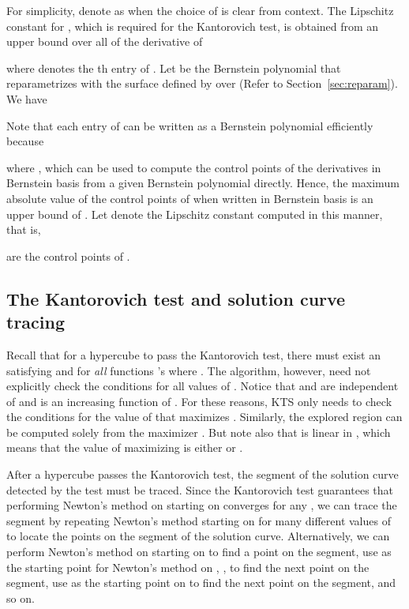 \documentclass{article}
\begin{document}
For simplicity, denote  as  when the choice of 
is clear from context.  The Lipschitz constant for , which is required for the Kantorovich test, is obtained
from an upper bound over all  of the derivative of 

where  denotes the th entry of
. Let  be
the Bernstein polynomial that reparametrizes with  the
surface defined by  over  (Refer to Section~\ref{sec:reparam}).
We have

Note that each entry of  can be written as a Bernstein
polynomial efficiently because

where , which can be used to compute
the control points of the derivatives in Bernstein basis from a
given Bernstein polynomial directly. Hence, the maximum absolute
value of the control points of  when written in
Bernstein basis is an upper bound of . Let  denote the Lipschitz
constant computed in this manner, that is,

 are the control points
of .


\subsection{The Kantorovich test and solution curve tracing}
\label{section_impkan}

Recall that for a hypercube  to pass the Kantorovich test,
there must exist an  satisfying  and  for
\emph{all} functions 's where . The algorithm, however, need not explicitly check the
conditions for all values of .  Notice that  and
 are independent of  and  is an increasing function
of .  For these reasons, KTS only needs to check the
conditions for the value of  that maximizes . Similarly,
the explored region  can be computed solely from the
maximizer .  But note also that  is linear in , which
means that the value of  maximizing  is either 
or .

After a hypercube passes the Kantorovich test, the segment of the
solution curve detected by the test must be traced.  Since
the Kantorovich test guarantees that performing Newton's
method on  starting on  converges for any , we can trace the segment by
repeating Newton's method starting on  for many different
values of  to locate the points on the segment of the
solution curve.  Alternatively, we can perform Newton's method on  starting on  to find a point  on the segment, use  as the starting point for Newton's method on , ,
to find the next point  on the segment, use  as the starting point on 
 to find the next point on the segment, and so on.
\end{document}
